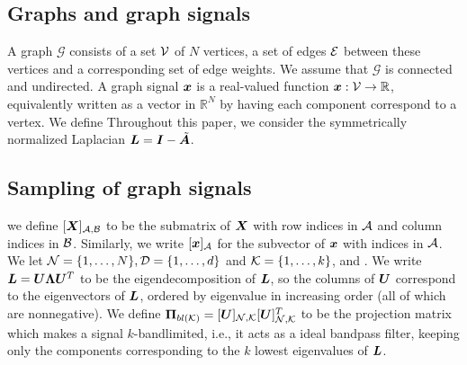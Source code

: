 \subsection{Graphs and graph signals}
A graph $\mathcal{G}$ consists of a set $\mathcal{V}$ of $N$ vertices, a set of edges $\mathcal{E}$ between these vertices and a corresponding set of edge weights. We assume that $\mathcal{G}$ is connected and undirected. A graph signal $\bm{x}$ is a real-valued function $\bm{x}:\mathcal{V} \to \mathbb{R}$, equivalently written as a vector in $\mathbb{R}^{N}$ by having each component correspond to a vertex.
We define 
Throughout this paper, we consider the symmetrically normalized Laplacian $\bm{L} = \bm{I} - \tilde{\bm{A}}$.

\subsection{Sampling of graph signals}
 we define $\matrsub[A,B]{X}$ to be the submatrix of $\bm{X}$ with row indices in $\mathcal{A}$ and column indices in $\mathcal{B}$. Similarly, we write $\vectsub[A]{x}$ for the subvector of $\bm{x}$ with indices in $\mathcal{A}$. We let $\mathcal{N} = \{1,\ldots,N\}, \textcolor{black}{\mathcal{D} = \{1,\ldots, d\}}$ and $\mathcal{K} = \{1,\ldots,k\}$, and .
We write $\bm{L} = \bm{U}\bm{\Lambda}\bm{U}^{T}$ to be the eigendecomposition of $\bm{L}$, so the columns of $\bm{U}$ correspond to the eigenvectors of $\bm{L}$, ordered by eigenvalue in increasing order (all of which are nonnegative). We define $\projbl = \matrsubU{N}\matrsubU{N}^{T}$ to be the projection matrix which makes a signal $k$-bandlimited, i.e., it acts as a ideal bandpass filter, keeping only the components corresponding to the $k$ lowest eigenvalues of $\bm{L}$.


